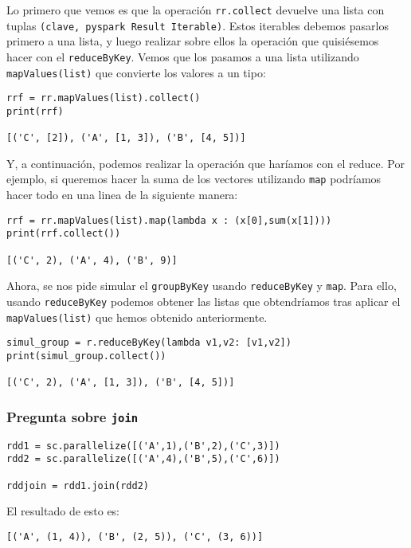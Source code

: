 \documentclass[11pt]{article}
\def\inline{\lstinline[basicstyle=\ttfamily,keywordstyle={}]}
\begin{document}
Lo primero que vemos es que la operación \inline{rr.collect} devuelve una lista con tuplas \inline{(clave, pyspark Result Iterable)}. Estos iterables debemos pasarlos primero a una lista, y luego realizar sobre ellos la operación que quisiésemos hacer con el \inline{reduceByKey}. Vemos que los pasamos a una lista utilizando \inline{mapValues(list)} que convierte los valores a un tipo:

\begin{verbatim}
rrf = rr.mapValues(list).collect()
print(rrf)

[('C', [2]), ('A', [1, 3]), ('B', [4, 5])]
\end{verbatim}

Y, a continuación, podemos realizar la operación que haríamos con el reduce. Por ejemplo, si queremos hacer la suma de los vectores utilizando \inline{map} podríamos hacer todo en una linea de la siguiente manera:

\begin{verbatim}
rrf = rr.mapValues(list).map(lambda x : (x[0],sum(x[1])))
print(rrf.collect())

[('C', 2), ('A', 4), ('B', 9)]
\end{verbatim}

Ahora, se nos pide simular el \inline{groupByKey} usando \inline{reduceByKey} y \inline{map}. Para ello, usando \inline{reduceByKey} podemos obtener las listas que obtendríamos tras aplicar el \inline{mapValues(list)} que hemos obtenido anteriormente.

\begin{verbatim}
simul_group = r.reduceByKey(lambda v1,v2: [v1,v2])
print(simul_group.collect())

[('C', 2), ('A', [1, 3]), ('B', [4, 5])]
\end{verbatim}

\subsubsection*{ Pregunta sobre \inline{join}}

\begin{verbatim}
rdd1 = sc.parallelize([('A',1),('B',2),('C',3)])
rdd2 = sc.parallelize([('A',4),('B',5),('C',6)])

rddjoin = rdd1.join(rdd2)
\end{verbatim}

El resultado de esto es:

\begin{verbatim}
[('A', (1, 4)), ('B', (2, 5)), ('C', (3, 6))]
\end{verbatim}
\end{document}

